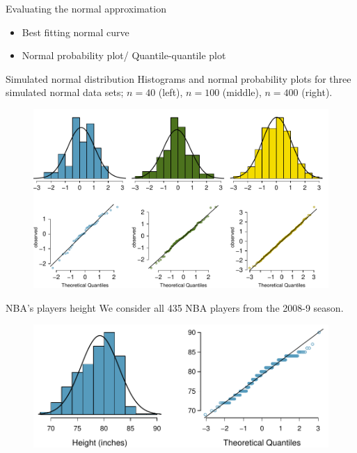 \documentclass[12pt,a4paper]{beamer}
\begin{document}
\begin{frame}{Evaluating the normal approximation}
\small	\begin{itemize}
		\item Best fitting normal curve
		\item Normal probability plot/ Quantile-quantile plot
	\end{itemize}
\end{frame}
\begin{frame}{Simulated normal distribution}
\small Histograms and normal probability plots for three simulated normal data sets; $n=40$ (left), $n=100$ (middle), $n=400$ (right).
	\begin{figure}
	\centering
	\includegraphics[width=\textwidth]{figures/normalExamples/normalExamples}
	\end{figure}
\end{frame}
\begin{frame}{NBA's players height}
We consider all 435 NBA players from the 2008-9 season.
\begin{figure}
\centering
\includegraphics[width=\textwidth]{figures/nbaNormal/nbaNormal}

\end{figure}
\end{frame}	
\end{document}
